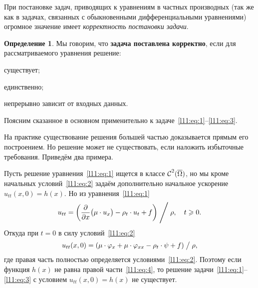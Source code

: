 \documentclass[12pt,a4paper,openany,fleqn]{book}
\newcommand{\Cf}{\ensuremath{\mathcal{C}}}
\newcommand{\Cfn}[2][]{\ensuremath{\Cf{\mathstrut}^{#2}_{#1}}}
\newcommand{\pder}[2]{\ensuremath{\frac{\partial#1}{\partial#2}}}
\theoremstyle{definition}
\newtheorem{_def}{Определение}[section]
\begin{document}
	При постановке задач, приводящих к уравнениям в частных производных (так же как в задачах, связанных с обыкновенными дифференциальными уравнениями) огромное значение имеет \emph{корректность постановки задачи}.
	\begin{_def}
		Мы говорим, что \textbf{задача поставлена корректно}, если для рассматриваемого уравнения решение:
		\begin{enumerateD}
			\item существует;
			\item единственно;
			\item непрерывно зависит от входных данных.
		\end{enumerateD} 
	\end{_def}
\noindent Поясним сказанное в основном применительно к задаче~\eqref{l11:eq:1}--\eqref{l11:eq:3}.
\begin{enumerateD}
	\item На практике существование решения большей частью доказывается прямым его построением. Но решение может не существовать, если наложить избыточные требования. Приведём два примера.
	\begin{enumerateD}
		\item Пусть решение уравнения~\eqref{l11:eq:1} ищется в классе $\Cfn{2}(\overline{\Omega})$, но мы кроме начальных условий~\eqref{l11:eq:2} задаём дополнительно начальное ускорение $u_{tt}(x,0)=h(x)$. Но из уравнения~\eqref{l11:eq:1}
		\begin{equation*}
			u_{tt}=\left(\pder{}{x}\big(\mu\cdot u_x\big)-\rho_t\cdot u_t+f\right)\Biggm/\rho,\quad t\geqslant0.
		\end{equation*}
		Откуда при $t=0$ в силу условий~\eqref{l11:eq:2}
		\begin{equation}
			\label{l11:eq:4}
			u_{tt}(x,0)=\left(\mu\cdot\phi_x+\mu\cdot\phi_{xx}-\rho_t\cdot\psi+f\right)\bigm/\rho,
		\end{equation}
		где правая часть полностью определяется условиями~\eqref{l11:eq:2}. Поэтому если функция $h(x)$ не равна правой части~\eqref{l11:eq:4}, то решение задачи~\eqref{l11:eq:1}--\eqref{l11:eq:3} с условием $u_{tt}(x,0)=h(x)$ не существует.
		

\end{enumerateD}
\end{enumerateD}
\end{document}
